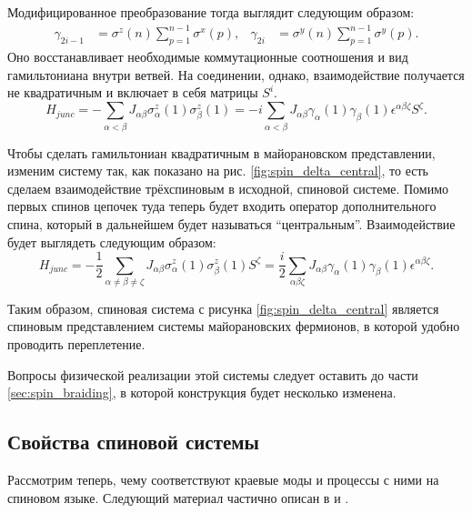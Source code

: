 \documentclass[a4paper,12pt]{article}
\theoremstyle{plain} %
\theoremstyle{definition} %
\theoremstyle{remark} %
\begin{document}
Модифицированное преобразование тогда выглядит следующим образом:
\begin{align}
    \gamma_{2i-1} &= \sigma^z (n) \sum\limits_{p=1}^{n-1} \sigma^x (p), & 
    \gamma_{2i} &= \sigma^y (n) \sum\limits_{p=1}^{n-1} \sigma^y (p).
\end{align}
Оно восстанавливает необходимые коммутационные соотношения и вид гамильтониана внутри ветвей. На соединении, однако, взаимодействие получается не квадратичным и включает в себя матрицы $S^i$.
\begin{equation}
    H_{junc} = - \sum\limits_{\alpha < \beta} J_{\alpha \beta} \sigma_\alpha^z (1) \sigma_\beta^z (1) = - i \sum\limits_{\alpha < \beta} J_{\alpha \beta} \gamma_\alpha (1) \gamma_\beta (1) \epsilon^{\alpha \beta \zeta} S^\zeta.
\end{equation}

Чтобы сделать гамильтониан квадратичным в майорановском представлении, изменим систему так, как показано на рис. \ref{fig:spin_delta_central}, то есть сделаем взаимодействие трёхспиновым в исходной, спиновой системе. Помимо первых спинов цепочек туда теперь будет входить оператор дополнительного спина, который в дальнейшем будет называться ``центральным''. Взаимодействие будет выглядеть следующим образом:
\begin{equation}
    H_{junc} = - \frac{1}{2} \sum\limits_{\alpha \neq \beta \neq \zeta} J_{\alpha \beta} \sigma_\alpha^z (1) \sigma_\beta^z (1) S^\zeta = \frac{i}{2} \sum\limits_{\alpha \beta \zeta} J_{\alpha \beta} \gamma_\alpha (1) \gamma_\beta (1) \epsilon^{\alpha \beta \zeta}.
    \label{eq:junc_H}
\end{equation}

Таким образом, спиновая система с рисунка \ref{fig:spin_delta_central} является спиновым представлением системы майорановских фермионов, в которой удобно проводить переплетение.

Вопросы физической реализации этой системы следует оставить до части \ref{sec:spin_braiding}, в которой конструкция будет несколько изменена. 

\pagebreak

\subsection{Свойства спиновой системы}

Рассмотрим теперь, чему соответствуют краевые моды и процессы с ними на спиновом языке. Следующий материал частично описан в \cite{arrays} и \cite{main}.
\end{document}
